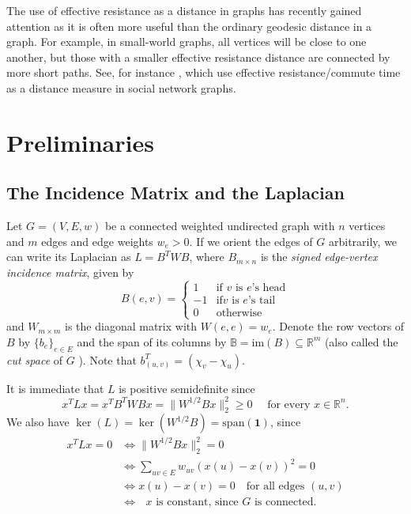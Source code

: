 \documentclass[11pt]{article}
\newcommand{\im}{\mathrm{im}}
\newcommand{\onevec}{\mathbf{1}}
\newcommand{\R}{\mathbb{R}}
\begin{document}
The use of effective resistance as a distance in graphs has recently gained attention
  as it is often more useful than the ordinary geodesic distance in a graph.
For example, in small-world graphs, all vertices will be close to one another, but those with a smaller
  effective resistance distance are connected by more short paths.
See, for instance \cite{fouss1,fouss2}, which use effective resistance/commute time
as a distance measure in social network graphs. 


\section{Preliminaries}
\subsection{The Incidence Matrix and the Laplacian} \label{secincidence}
Let $G=(V,E,w)$ be a connected weighted undirected graph with $n$ vertices and $m$
edges and edge weights $w_e > 0$. If we orient the edges of $G$
arbitrarily, we can write its Laplacian as $L=B^TWB$, where $B_{m\times n}$ is the
{\em signed edge-vertex incidence matrix}, given by
\[ B(e,v)= \left\{\begin{array}{ll} 1 &\textrm{if $v$ is $e$'s head}\\ -1 &\textrm{if
$v$ is $e$'s tail}\\ 0 & \textrm{otherwise}\end{array}\right.\]
and $W_{m\times m}$ is the diagonal matrix with $W(e,e)=w_e$. 
Denote the
row vectors of $B$ by $\{b_e\}_{e\in E}$ and the span of its columns by
$\mathbb{B}=\im(B)\subseteq \R^m$ (also called the {\em cut space} of $G$ \cite{GodsilRoyle}).
Note that $b_{(u,v)}^T=(\chi_v-\chi_u)$.

It is immediate that $L$ is positive semidefinite since
\[ x^TLx=x^TB^TWBx=\|W^{1/2}Bx\|_2^2\ge 0\quad\textrm{ for every $x\in\R^n$.}\]
We also have $\ker(L)=\ker(W^{1/2}B)=\textrm{span}(\onevec)$, since 
\begin{align*}
x^TLx=0 &\iff \|W^{1/2}Bx\|_2^2=0
\\&\iff \sum_{uv\in E}w_{uv}(x(u)-x(v))^2=0
\\&\iff x(u)-x(v)=0\quad\textrm{for all edges $(u,v)$}
\\&\iff \textrm{ $x$ is constant, since $G$ is connected.}\end{align*}
\end{document}
